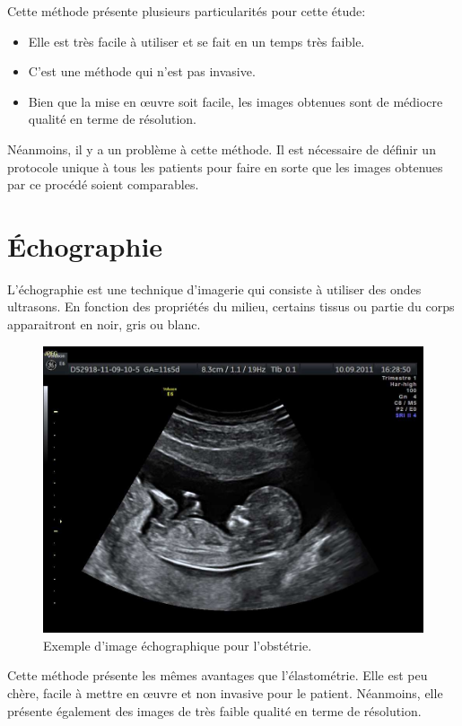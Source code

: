 Cette méthode présente plusieurs particularités pour cette étude:

\begin{itemize}
\item Elle est très facile à utiliser et se fait en un temps très faible. 
\item C'est une méthode qui n'est pas invasive.
\item Bien que la mise en œuvre soit facile, les images obtenues sont de médiocre qualité en terme de résolution.
\end{itemize}

Néanmoins, il y a un problème à cette méthode. Il est nécessaire de définir un protocole unique à tous les patients pour faire en sorte que les images obtenues par ce procédé soient comparables.

 
\section{Échographie}

L'échographie est une technique d'imagerie qui consiste à utiliser des ondes ultrasons. En fonction des propriétés du milieu, certains tissus ou partie du corps apparaitront en noir, gris ou blanc. 

\begin{figure}[H]
\centering
    \includegraphics[scale=0.6,angle=0]{Images/Echographie-profil.jpg}
    \caption{Exemple d'image échographique pour l'obstétrie.}
    \label{fig:Echographie}
\end{figure}

Cette méthode présente les mêmes avantages que l'élastométrie. Elle est peu chère, facile à mettre en œuvre et non invasive pour le patient. Néanmoins, elle présente également des images de très faible qualité en terme de résolution.


